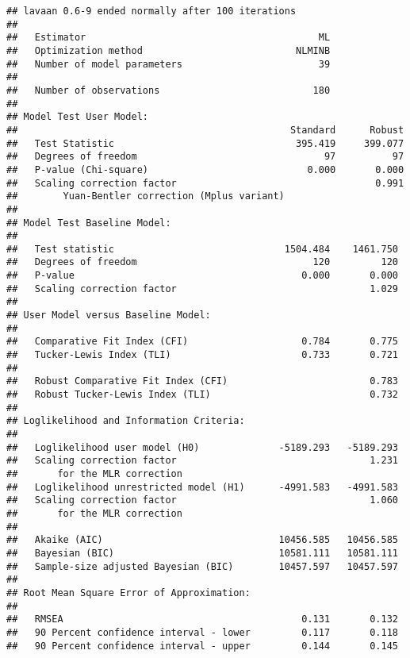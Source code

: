 \documentclass[
  english,
  man]{apa6}
\begin{document}
\begin{verbatim}
## lavaan 0.6-9 ended normally after 100 iterations
## 
##   Estimator                                         ML
##   Optimization method                           NLMINB
##   Number of model parameters                        39
##                                                       
##   Number of observations                           180
##                                                       
## Model Test User Model:
##                                                Standard      Robust
##   Test Statistic                                395.419     399.077
##   Degrees of freedom                                 97          97
##   P-value (Chi-square)                            0.000       0.000
##   Scaling correction factor                                   0.991
##        Yuan-Bentler correction (Mplus variant)                     
## 
## Model Test Baseline Model:
## 
##   Test statistic                              1504.484    1461.750
##   Degrees of freedom                               120         120
##   P-value                                        0.000       0.000
##   Scaling correction factor                                  1.029
## 
## User Model versus Baseline Model:
## 
##   Comparative Fit Index (CFI)                    0.784       0.775
##   Tucker-Lewis Index (TLI)                       0.733       0.721
##                                                                   
##   Robust Comparative Fit Index (CFI)                         0.783
##   Robust Tucker-Lewis Index (TLI)                            0.732
## 
## Loglikelihood and Information Criteria:
## 
##   Loglikelihood user model (H0)              -5189.293   -5189.293
##   Scaling correction factor                                  1.231
##       for the MLR correction                                      
##   Loglikelihood unrestricted model (H1)      -4991.583   -4991.583
##   Scaling correction factor                                  1.060
##       for the MLR correction                                      
##                                                                   
##   Akaike (AIC)                               10456.585   10456.585
##   Bayesian (BIC)                             10581.111   10581.111
##   Sample-size adjusted Bayesian (BIC)        10457.597   10457.597
## 
## Root Mean Square Error of Approximation:
## 
##   RMSEA                                          0.131       0.132
##   90 Percent confidence interval - lower         0.117       0.118
##   90 Percent confidence interval - upper         0.144       0.145

\end{verbatim}
\end{document}
